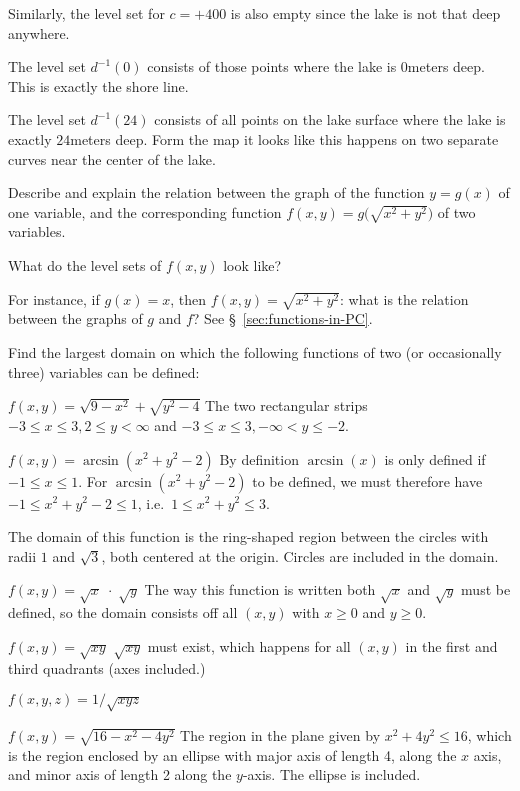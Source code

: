 \begin{multicols}{2}
Similarly, the level set for $c=+400$ is also empty since the lake is not that
deep anywhere.

The level set $d^{-1}(0)$ consists of those points where the lake is $0$meters
deep.  This is exactly the shore line.

The level set $d^{-1}(24)$ consists of all points on the lake surface where the
lake is exactly $24$meters deep.  Form the map it looks like this happens on two
separate curves near the center of the lake.
\endanswer



\problem Describe and explain the relation between the graph of the 
function $y=g(x)$ of one variable, and the corresponding function
$f(x, y) = g\bigl( \sqrt{x^2+y^2} \bigr)$ of two variables.

What do the level sets of $f(x, y)$ look like?

For instance, if $g(x) = x$, then $f(x, y) = \sqrt{x^2+y^2}$: what is
the relation between the graphs of $g$ and $f$?
\answer
See \S~\ref{sec:functions-in-PC}.
\endanswer


\problem Find the largest domain on which 
the following functions of two (or occasionally three) variables can be defined:

\subprob  $f(x, y) = \sqrt{9-x^2}+\sqrt{y^2-4}$
\answer
The two rectangular strips $-3\leq x\leq3, 2\leq y<\infty$ and
$-3\leq x\leq3, -\infty<y\leq-2$.
\endanswer

\subprob  $f(x, y) = \arcsin(x^2+y^2-2)$
\answer
By definition $\arcsin(x)$ is only defined if $-1\leq x\leq1$.
For $\arcsin(x^2+y^2-2)$ to be defined, we must therefore have
$-1\leq x^2+y^2-2 \leq 1$, i.e.\ $1\leq x^2+y^2 \leq 3$.

The domain of this function is
the ring-shaped region between the circles with radii $1$ and
$\sqrt{3}$, both centered at the origin.
Circles are included in the domain.
\endanswer

\subprob  $f(x, y) = \sqrt{x}\;\cdot\;\sqrt{y}$
\answer
The way this function is written both $\sqrt x$ and $\sqrt y$ must be defined,
so the domain consists off all $(x,y)$ with $x\geq0$ and $y\geq0$.
\endanswer

\subprob  $f(x, y) = \sqrt{xy}$
\answer
$\sqrt{xy}$ must exist, which happens for all $(x,y)$ in the first
and third quadrants (axes included.)
\endanswer

\subprob  $f(x, y, z) = 1/\sqrt{xyz}$

\subprob  $f(x, y) = \sqrt{16-x^2-4y^2}$
\answer
The region in the plane given by $x^2+4y^2\leq16$, which is the region
enclosed by an ellipse with
major axis of length 4, along the $x$ axis, and minor axis of length
2 along the $y$-axis.  The ellipse is included.
\endanswer


\end{multicols}
